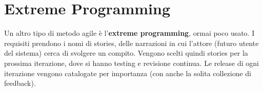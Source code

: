 \section{Extreme Programming}
Un altro tipo di metodo agile è l'\textbf{extreme programming}, ormai poco usato.
I requisiti prendono i nomi di stories, delle narrazioni in cui l’attore
(futuro utente del sistema) cerca di svolgere un compito. Vengono scelti quindi stories
per la prossima iterazione, dove si hanno testing e revisione continua. Le release
di ogni iterazione vengono catalogate per importanza (con anche la solita collezione di feedback).